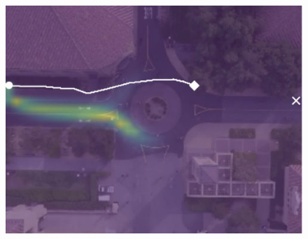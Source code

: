 \documentclass[letterpaper,10pt,conference]{ieeeconf}
\begin{document}
\begin{figure}
\begin{minipage}[c]{0.3\linewidth}
		\includegraphics[width=\linewidth]{./figures/comparison/kit_death_1_2_t=370.jpg}
	\end{minipage}
	

\end{figure}
\end{document}
